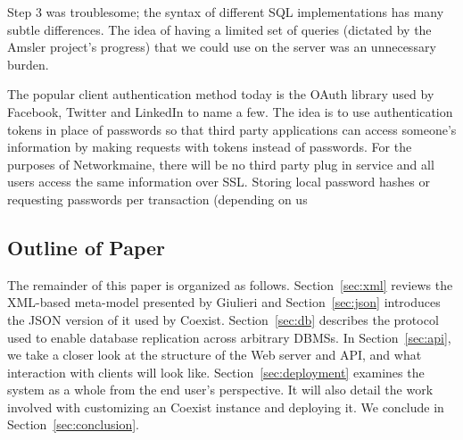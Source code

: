Step 3 was troublesome; the syntax of different SQL implementations has many
subtle differences. The idea of having a limited set of queries (dictated by the
Amsler project's progress) that we could use on the server was an unnecessary
burden.


The popular client authentication method today is the OAuth
library\cite{_oauth_????} used by Facebook, Twitter and LinkedIn to name a few.
The idea is to use authentication tokens in place of passwords so that third
party applications can access someone's information by making requests with
tokens instead of passwords. For the purposes of Networkmaine, there will be no
third party plug in service and all users access the same information over SSL.
Storing local password hashes or requesting passwords per transaction (depending
on us

\subsection{Outline of Paper} \label{sec:outline}


The remainder of this paper is organized as follows. Section~\ref{sec:xml}
reviews the XML-based meta-model presented by Giulieri and
Section~\ref{sec:json} introduces the JSON version of it used by Coexist.
Section~\ref{sec:db} describes the protocol used to enable database replication
across arbitrary DBMSs. In Section~\ref{sec:api}, we take a closer look at the
structure of the Web server and API, and what interaction with clients will look
like. Section~\ref{sec:deployment} examines the system as a whole from the end
user's perspective. It will also detail the work involved with customizing an
Coexist instance and deploying it. We conclude in Section~\ref{sec:conclusion}.


